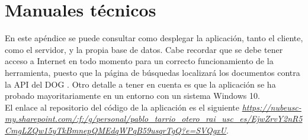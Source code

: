 \chapter{Manuales técnicos}

En este apéndice se puede consultar como desplegar la aplicación, tanto el cliente, como el servidor, y la propia base de datos. Cabe recordar que se debe tener acceso a Internet en todo momento para un correcto funcionamiento de la herramienta, puesto que la página de búsquedas localizará los documentos contra la API del DOG \cite{dog}. Otro detalle a tener en cuenta es que la aplicación se ha probado mayoritariamente en un entorno con un sistema Windows 10.
\\

El enlace al repositorio del código de la aplicación es el siguiente {\it \url{https://nubeusc-my.sharepoint.com/:f:/g/personal/pablo_tarrio_otero_rai_usc_es/EjwZrvY2nR5CmgLZQw15yTkBmnepQMEdqWPqB59usqrTgQ?e=SVQgxU}}.


